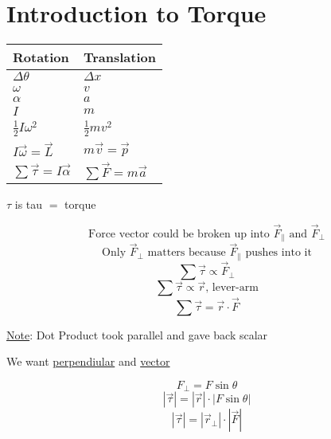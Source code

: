 \documentclass[fleqn]{article}
\begin{document}
\setlength{\mathindent}{0pt}
\section*{Introduction to Torque}
\begin{table}[H]
	\centering
	\begin{tabularx}{\textwidth}{|X|X|}
		\hline
		Rotation                              & Translation                    \\
		\hline
		$ \Delta \theta $                     & $\Delta x $                    \\
		\hline
		$ \omega  $                           & $ v $                          \\
		\hline
		$ \alpha  $                           & $ a $                          \\
		\hline
		$ I $                                 & $ m $                          \\
		\hline
		$ \frac{1}{2} I \omega ^2 $           & $ \frac{1}{2} mv ^2 $          \\
		\hline
		$ I \vec{\omega } = \vec{L}  $        & $ m \vec{v} = \vec{p}  $       \\
		\hline
		$ \sum \vec{\tau}= I \vec{\alpha }  $ & $ \sum \vec{F} = m \vec{a}   $ \\
		\hline
	\end{tabularx}
\end{table}

$ \tau $ is tau $ =  $ torque

\[ \text{Force vector could be broken up into } \vec{F}_{\parallel} \text{ and } \vec{F}_{\perp}\]
\[ \text{Only } \vec{F}_{\perp} \text{ matters because } \vec{F}_{\parallel} \text{ pushes into it}        \]
\[ \sum \vec{\tau} \propto \vec{F}_{\perp}    \]
\[ \sum \vec{\tau} \propto \vec{r} \text{, lever-arm}   \]
\[ \sum \vec{\tau} = \vec{r} \cdot \vec{F}   \]

\underline{Note}: Dot Product took parallel and gave back scalar

We want \underline{perpendiular} and \underline{vector}

\[ F _{\perp} = F \sin \theta   \]
\[ |\vec{\tau}| = |\vec{r}| \cdot |F \sin \theta |    \]
\[ |\vec{\tau}| = |\vec{r}_{\perp}| \cdot |\vec{F}|     \]
\end{document}
